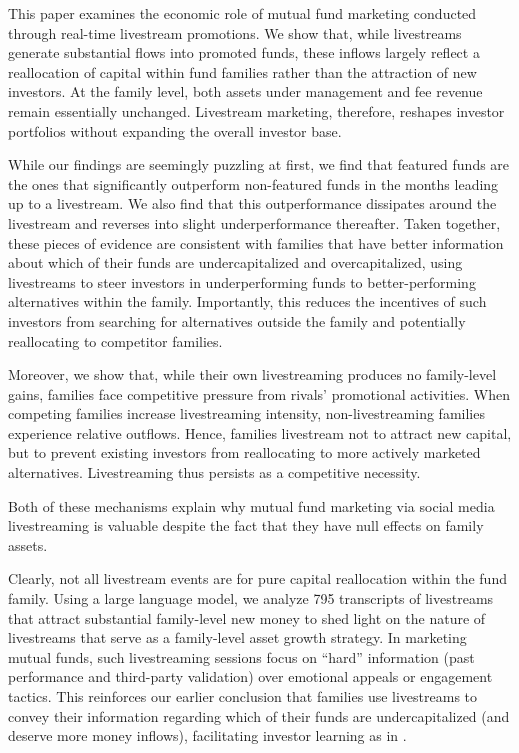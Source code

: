 \documentclass[12pt]{article}
\begin{document}
This paper examines the economic role of mutual fund marketing conducted through real-time livestream promotions. We show that, while livestreams generate substantial flows into promoted funds, these inflows largely reflect a reallocation of capital within fund families rather than the attraction of new investors. At the family level, both assets under management and fee revenue remain essentially unchanged. Livestream marketing, therefore, reshapes investor portfolios without expanding the overall investor base.

While our findings are seemingly puzzling at first, we find that featured funds are the ones that significantly outperform non-featured funds in the months leading up to a livestream. We also find that this outperformance dissipates around the livestream and reverses into slight underperformance thereafter. Taken together, these pieces of evidence are consistent with families that have better information about which of their funds are undercapitalized and overcapitalized, using livestreams to steer investors in underperforming funds to better-performing alternatives within the family. Importantly, this reduces the incentives of such investors from searching for alternatives outside the family and potentially reallocating to competitor families.

Moreover, we show that, while their own livestreaming produces no family-level gains, families face competitive pressure from rivals' promotional activities. When competing families increase livestreaming intensity, non-livestreaming families experience relative outflows. Hence, families livestream not to attract new capital, but to prevent existing investors from reallocating to more actively marketed alternatives. Livestreaming thus persists as a competitive necessity.

Both of these mechanisms explain why mutual fund marketing via social media livestreaming is valuable despite the fact that they have null effects on family assets.

Clearly, not all livestream events are for pure capital reallocation within the fund family. Using a large language model, we analyze 795 transcripts of livestreams that attract substantial family-level new money to shed light on the nature of livestreams that serve as a family-level asset growth strategy. In marketing mutual funds, such livestreaming sessions focus on ``hard'' information (past performance and third-party validation) over emotional appeals or engagement tactics. This reinforces our earlier conclusion that families use livestreams to convey their information regarding which of their funds are undercapitalized (and deserve more money inflows), facilitating investor learning as in \citep{berk2004mutual}.
\end{document}
